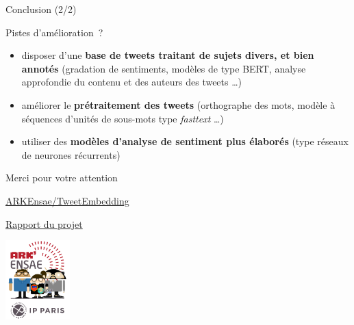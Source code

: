 \documentclass[10pt,xcolor=table,color={dvipsnames,usenames},ignorenonframetext,usepdftitle=false,french]{beamer}
\begin{document}
\begin{frame}{Conclusion (2/2)}
\protect\hypertarget{conclusion-22}{}

Pistes d'amélioration~?

\begin{itemize}
\item
  disposer d'une \textbf{base de tweets traitant de sujets divers, et
  bien annotés} \footnotesize (gradation de sentiments, modèles de type
  BERT, analyse approfondie du contenu et des auteurs des tweets \dots)
  \normalsize
\item
  améliorer le \textbf{prétraitement des tweets}
  \footnotesize (orthographe des mots, modèle à séquences d'unités de
  sous-mots type \emph{fasttext} \dots)\normalsize
\item
  utiliser des \textbf{modèles d'analyse de sentiment plus élaborés}
  \footnotesize  (type réseaux de neurones récurrents)\normalsize
\end{itemize}

\end{frame}

\begin{frame}{Merci pour votre attention}
\protect\hypertarget{merci-pour-votre-attention}{}

\href{https://github.com/ARKEnsae/TweetEmbedding}{\faGithub{} ARKEnsae/TweetEmbedding}

\href{https://arkensae.github.io//TweetEmbedding/Redaction/Rapport_Final/Rapport.pdf}{\faEdit{} Rapport du projet}

\begin{center}
\includegraphics[width = 2.5cm]{img/LOGO-ENSAE.png}
\end{center}

\end{frame}
\end{document}
